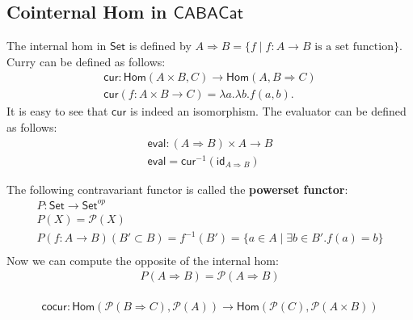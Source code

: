 \documentclass{article}
\newcommand{\powerset}[1]{\mathcal{P}(#1)}
\newcommand{\CABAC}[0]{\mathsf{CABACat}}
\newcommand{\Set}[0]{\mathsf{Set}}
\newcommand{\imp}[0]{\Rightarrow}
\newcommand{\cur}[0]{\mathsf{cur}}
\newcommand{\cocur}[0]{\mathsf{cocur}}
\newcommand{\id}[0]{\mathsf{id}}
\newcommand{\Hom}[2]{\mathsf{Hom}(#1,#2)}
\newcommand{\eval}[0]{\mathsf{eval}}
\begin{document}
\subsection{Cointernal Hom in $\CABAC$}
\label{subsec:cointernal_hom_in_CABACat}
The internal hom in $\Set$ is defined by $A \imp B = \{f \mid f : A
\to B \text{ is a set function} \}$.  Curry can be defined as follows:
\[
\begin{array}{lll}
  \cur : \Hom{A \times B}{C} \to \Hom{A}{B \imp C}\\
  \cur(f : A \times B \to C) = \lambda a.\lambda b.f(a,b).  
\end{array}
\]
It is easy to see that $\cur$ is indeed an isomorphism.  The evaluator
can be defined as follows:
\[
\begin{array}{lll}
  \eval : (A \imp B) \times A \to B\\
  \eval = \cur^{-1}(\id_{A \imp B})
\end{array}
\]

The following contravariant functor is called the \textbf{powerset functor}:
\[
\begin{array}{lll}
  P : \Set \to \Set^{op}\\
  P(X) = \powerset{X}\\
  P(f : A \to B)(B' \subset B) = f^{-1}(B') = \{a \in A \mid \exists b \in B'.f(a) = b \}\\
\end{array}
\]
Now we can compute the opposite of the internal hom:
\[
\begin{array}{lll}
  P(A \imp B) = \powerset{A \imp B}\\
\end{array}
\]

\[
\cocur : \Hom{\powerset{B \imp C}}{\powerset{A}} \to \Hom{\powerset{C}}{\powerset{A \times B}}
\]

\end{document}
